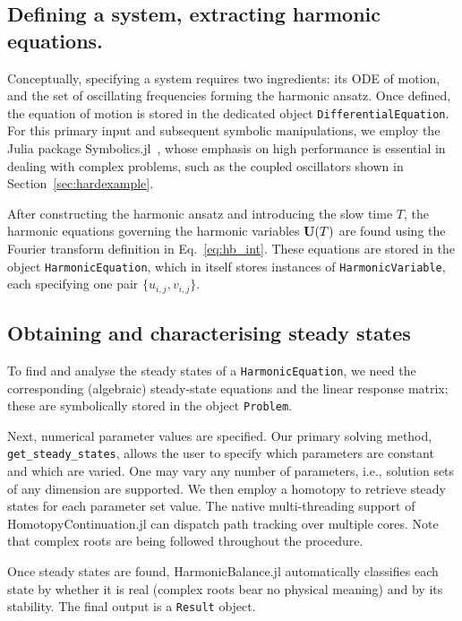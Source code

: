 \subsection{Defining a system, extracting harmonic equations.}

Conceptually, specifying a system requires two ingredients: its ODE of motion, and the set of oscillating frequencies forming the harmonic ansatz. Once defined, the equation of motion is stored in the dedicated object \texttt{DifferentialEquation}. For this primary input and subsequent symbolic manipulations, we employ the Julia package Symbolics.jl~\cite{10.1145/3511528.3511535}, whose emphasis on high performance is essential in dealing with complex problems, such as the coupled oscillators shown in Section~\ref{sec:hardexample}. 

After constructing the harmonic ansatz and introducing the slow time $T$, the harmonic equations governing the harmonic variables $\vb{U}(T)$ are found using the Fourier transform definition in Eq.~\eqref{eq:hb_int}. These equations are stored in the object \texttt{HarmonicEquation}, which in itself stores instances of \texttt{HarmonicVariable}, each specifying one pair $\{u_{i,j}, v_{i,j}\}$.


\subsection{Obtaining and characterising steady states}

To find and analyse the steady states of a \texttt{HarmonicEquation}, we need the corresponding (algebraic) steady-state equations and the linear response matrix; these are symbolically stored in the object \texttt{Problem}.

Next, numerical parameter values are specified. Our primary solving method, \texttt{get\_steady\_states}, allows the user to specify which parameters are constant and which are varied. One may vary any number of parameters, i.e., solution sets of any dimension are supported. We then employ a homotopy to retrieve steady states for each parameter set value. The native multi-threading support of HomotopyContinuation.jl can dispatch path tracking over multiple cores. Note that complex roots are being followed throughout the procedure.

Once steady states are found, HarmonicBalance.jl automatically classifies each state by whether it is real (complex roots bear no physical meaning) and by its stability. The final output is a \texttt{Result} object.

